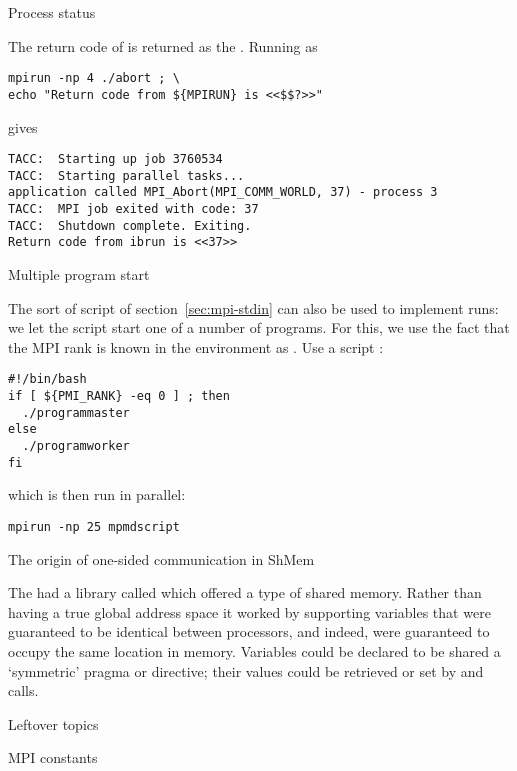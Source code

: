 
 {Process status}

The return code of  is returned as the
.
Running
as
\begin{verbatim}
mpirun -np 4 ./abort ; \
echo "Return code from ${MPIRUN} is <<$$?>>"
\end{verbatim}
gives
\begin{verbatim}
TACC:  Starting up job 3760534
TACC:  Starting parallel tasks...
application called MPI_Abort(MPI_COMM_WORLD, 37) - process 3
TACC:  MPI job exited with code: 37
TACC:  Shutdown complete. Exiting.
Return code from ibrun is <<37>>
\end{verbatim}

 {Multiple program start}
\label{sec:mpmd-start}

The sort of script of section~\ref{sec:mpi-stdin}
can also be used to implement  runs:
we let the script start one of a number of programs. For this, we use
the fact that the MPI rank is known in the environment as
. Use a script :
\begin{verbatim}
#!/bin/bash
if [ ${PMI_RANK} -eq 0 ] ; then
  ./programmaster
else
  ./programworker
fi
\end{verbatim}
which is then run in parallel:
\begin{verbatim}
mpirun -np 25 mpmdscript
\end{verbatim}

 {The origin of one-sided communication in ShMem}

The  had a library called 
which offered a type of shared memory. Rather than having a true
global address space it worked by supporting variables that were
guaranteed to be identical between processors, and indeed, were
guaranteed to occupy the same location in memory. Variables could be
declared to be shared a `symmetric' pragma or directive; their values
could be retrieved or set by \n{shmem_get} and \n{shmem_put} calls.

 {Leftover topics}

 {MPI constants}


